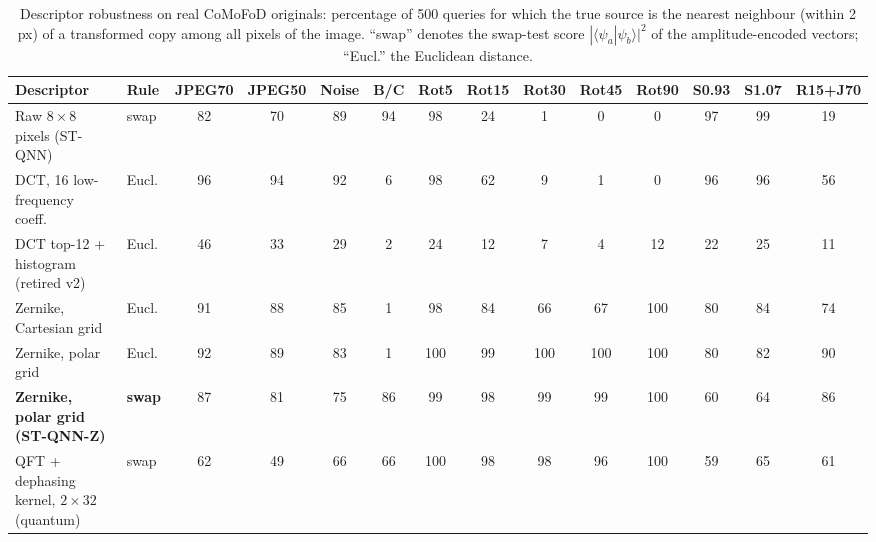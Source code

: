 \documentclass[conference]{IEEEtran}
\begin{document}
\begin{table}[t]
\centering
\caption{Descriptor robustness on real CoMoFoD originals: percentage of 500 queries for which the true source is the nearest neighbour (within 2 px) of a transformed copy among all pixels of the image. ``swap'' denotes the swap-test score $|\langle\psi_a|\psi_b\rangle|^2$ of the amplitude-encoded vectors; ``Eucl.'' the Euclidean distance.}
\label{tab:zrobust}
\setlength{\tabcolsep}{3.6pt}
\begin{tabular}{llcccccccccccc}
\toprule
\textbf{Descriptor} & \textbf{Rule} & \textbf{JPEG70} & \textbf{JPEG50} & \textbf{Noise} & \textbf{B/C} & \textbf{Rot5} & \textbf{Rot15} & \textbf{Rot30} & \textbf{Rot45} & \textbf{Rot90} & \textbf{S0.93} & \textbf{S1.07} & \textbf{R15+J70}\\
\midrule
Raw $8\times8$ pixels (ST-QNN) & swap & 82 & 70 & 89 & 94 & 98 & 24 & 1 & 0 & 0 & 97 & 99 & 19\\
DCT, 16 low-frequency coeff.~\cite{fridrich2003} & Eucl. & 96 & 94 & 92 & 6 & 98 & 62 & 9 & 1 & 0 & 96 & 96 & 56\\
DCT top-12 + histogram (retired v2) & Eucl. & 46 & 33 & 29 & 2 & 24 & 12 & 7 & 4 & 12 & 22 & 25 & 11\\
Zernike, Cartesian grid & Eucl. & 91 & 88 & 85 & 1 & 98 & 84 & 66 & 67 & 100 & 80 & 84 & 74\\
Zernike, polar grid~\cite{cozzolino2015} & Eucl. & 92 & 89 & 83 & 1 & 100 & 99 & 100 & 100 & 100 & 80 & 82 & 90\\
\textbf{Zernike, polar grid (ST-QNN-Z)} & \textbf{swap} & 87 & 81 & 75 & 86 & 99 & 98 & 99 & 99 & 100 & 60 & 64 & 86\\
QFT + dephasing kernel, $2\times32$ (quantum) & swap & 62 & 49 & 66 & 66 & 100 & 98 & 98 & 96 & 100 & 59 & 65 & 61\\
\bottomrule
\end{tabular}
\end{table}
\end{document}
